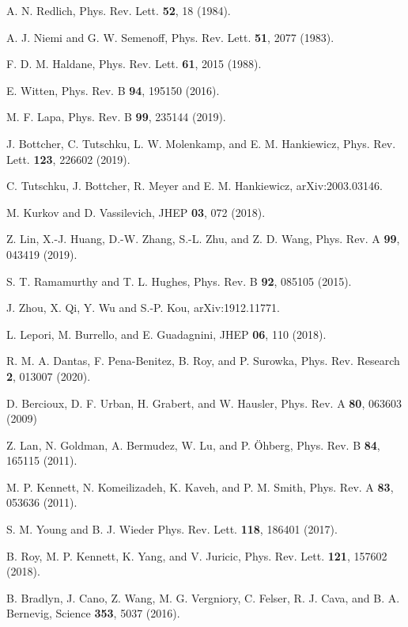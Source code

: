 \documentclass[twocolumn,prl,10pt,superscriptaddress]{revtex4}
\begin{document}
\begin{thebibliography}{99}
A. N. Redlich, Phys. Rev. Lett. \textbf{52}, 18 (1984).

A. J. Niemi and G. W. Semenoff, Phys. Rev. Lett. \textbf{51}, 2077
(1983).

F. D. M. Haldane,
Phys. Rev. Lett. \textbf{61}, 2015 (1988).

E. Witten,
Phys. Rev. B \textbf{94}, 195150 (2016).

M. F. Lapa,
Phys. Rev. B \textbf{99}, 235144 (2019).

J. Bottcher, C. Tutschku, L. W. Molenkamp, and E. M. Hankiewicz,
Phys. Rev. Lett. \textbf{123}, 226602 (2019).

C. Tutschku, J. Bottcher, R. Meyer and E. M. Hankiewicz,
arXiv:2003.03146.

M. Kurkov and D. Vassilevich, JHEP \textbf{03}, 072 (2018).


Z. Lin, X.-J. Huang, D.-W. Zhang, S.-L. Zhu, and Z. D. Wang,
Phys. Rev. A \textbf{99}, 043419 (2019).

S. T. Ramamurthy and T. L. Hughes,
Phys. Rev. B \textbf{92}, 085105 (2015).

J. Zhou, X. Qi, Y. Wu and S.-P. Kou, arXiv:1912.11771.

L. Lepori, M. Burrello, and E. Guadagnini,
JHEP \textbf{06}, 110 (2018).

R. M. A. Dantas, F. Pena-Benitez, B. Roy, and P. Surowka,
Phys. Rev. Research \textbf{2}, 013007 (2020).




D. Bercioux, D. F. Urban, H. Grabert, and W. Hausler,
Phys. Rev. A \textbf{80}, 063603 (2009)

Z. Lan, N. Goldman, A. Bermudez, W. Lu, and P. \"{O}hberg, Phys. Rev. B \textbf{84}, 165115 (2011).

M. P. Kennett, N. Komeilizadeh, K. Kaveh, and P. M. Smith,
Phys. Rev. A \textbf{83}, 053636 (2011).

S. M. Young and B. J. Wieder
Phys. Rev. Lett. \textbf{118}, 186401 (2017).

B. Roy, M. P. Kennett, K. Yang, and V. Juricic,
Phys. Rev. Lett. \textbf{121}, 157602 (2018).


 B. Bradlyn, J. Cano, Z. Wang, M. G.
Vergniory, C. Felser, R. J. Cava, and B. A. Bernevig, Science \textbf{353}, 5037 (2016).


\end{thebibliography}
\end{document}
